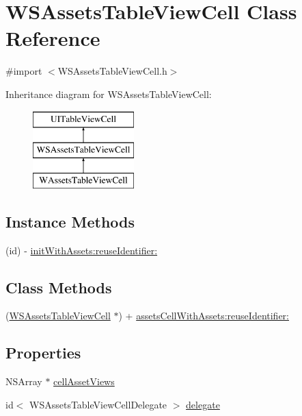 \hypertarget{interface_w_s_assets_table_view_cell}{\section{W\-S\-Assets\-Table\-View\-Cell Class Reference}
\label{interface_w_s_assets_table_view_cell}
}


{\ttfamily \#import $<$W\-S\-Assets\-Table\-View\-Cell.\-h$>$}

Inheritance diagram for W\-S\-Assets\-Table\-View\-Cell\-:\begin{figure}[H]
\begin{center}
\leavevmode
\includegraphics[height=3.000000cm]{interface_w_s_assets_table_view_cell}
\end{center}
\end{figure}
\subsection*{Instance Methods}
\begin{DoxyCompactItemize}
\item 
(id) -\/ \hyperlink{interface_w_s_assets_table_view_cell_a75b11e518dba0310cb2ccf7ba43aa14a}{init\-With\-Assets\-:reuse\-Identifier\-:}
\end{DoxyCompactItemize}
\subsection*{Class Methods}
\begin{DoxyCompactItemize}
\item 
(\hyperlink{interface_w_s_assets_table_view_cell}{W\-S\-Assets\-Table\-View\-Cell} $\ast$) + \hyperlink{interface_w_s_assets_table_view_cell_a4a6bf48fc42c850936e34dfc91f34132}{assets\-Cell\-With\-Assets\-:reuse\-Identifier\-:}
\end{DoxyCompactItemize}
\subsection*{Properties}
\begin{DoxyCompactItemize}
\item 
N\-S\-Array $\ast$ \hyperlink{interface_w_s_assets_table_view_cell_a41052ba948bdf8333384697615719d69}{cell\-Asset\-Views}
\item 
id$<$ W\-S\-Assets\-Table\-View\-Cell\-Delegate $>$ \hyperlink{interface_w_s_assets_table_view_cell_abba23424e61e11fea535a200b60ba78b}{delegate}
\end{DoxyCompactItemize}


